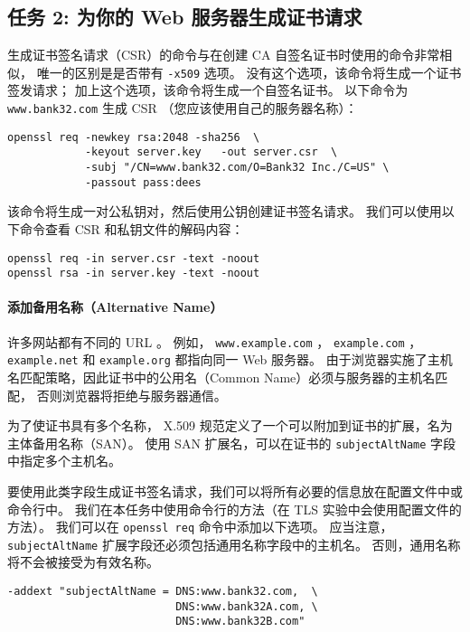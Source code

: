 \subsection{任务 2: 为你的 Web 服务器生成证书请求}

生成证书签名请求（CSR）的命令与在创建 CA 自签名证书时使用的命令非常相似，
唯一的区别是是否带有 \texttt{-x509} 选项。
没有这个选项，该命令将生成一个证书签发请求；
加上这个选项，该命令将生成一个自签名证书。
以下命令为 \texttt{www.bank32.com} 生成 CSR （您应该使用自己的服务器名称）：

\begin{lstlisting}
openssl req -newkey rsa:2048 -sha256  \
            -keyout server.key   -out server.csr  \
            -subj "/CN=www.bank32.com/O=Bank32 Inc./C=US" \
            -passout pass:dees
\end{lstlisting}

该命令将生成一对公私钥对，然后使用公钥创建证书签名请求。
我们可以使用以下命令查看 CSR 和私钥文件的解码内容：

\begin{lstlisting}
openssl req -in server.csr -text -noout
openssl rsa -in server.key -text -noout
\end{lstlisting}

\paragraph{添加备用名称（Alternative Name）}
许多网站都有不同的 URL 。
例如， \texttt{www.example.com} ， \texttt{example.com} ， \texttt{example.net}
和 \texttt{example.org} 都指向同一 Web 服务器。
由于浏览器实施了主机名匹配策略，因此证书中的公用名（Common Name）必须与服务器的主机名匹配，
否则浏览器将拒绝与服务器通信。

为了使证书具有多个名称， X.509 规范定义了一个可以附加到证书的扩展，名为主体备用名称（SAN）。
使用 SAN 扩展名，可以在证书的 \texttt{subjectAltName} 字段中指定多个主机名。

要使用此类字段生成证书签名请求，我们可以将所有必要的信息放在配置文件中或命令行中。
我们在本任务中使用命令行的方法（在 TLS 实验中会使用配置文件的方法）。
我们可以在 \texttt{openssl req} 命令中添加以下选项。
应当注意， \texttt{subjectAltName} 扩展字段还必须包括通用名称字段中的主机名。
否则，通用名称将不会被接受为有效名称。

\begin{lstlisting}
-addext "subjectAltName = DNS:www.bank32.com,  \
                          DNS:www.bank32A.com, \
                          DNS:www.bank32B.com"
\end{lstlisting}


